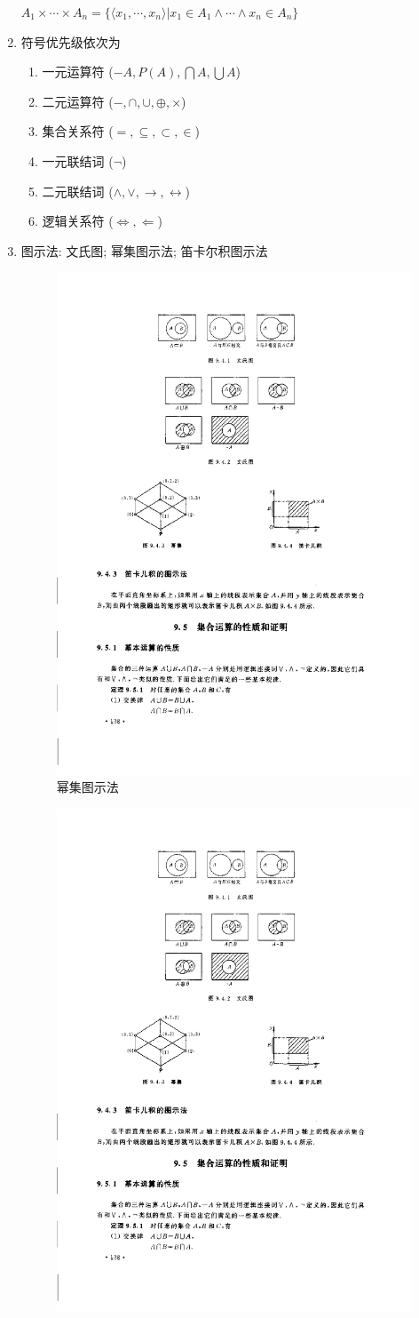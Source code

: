 \documentclass[11pt,a4paper,twocolumn,fleqn]{article} %
\begin{document}
\begin{enumerate}
	$A_1\times\cdots\times A_n = \{\langle x_1, \cdots, x_n \rangle|
	x_1\in A_1\land\cdots\land x_n\in A_n\}$
	\item 符号优先级依次为
	\begin{enumerate}
		\item 一元运算符 ($-A, P(A), \bigcap A, \bigcup A$)
		\item 二元运算符 ($-, \cap, \cup, \oplus, \times$)
		\item 集合关系符 ($=, \subseteq, \subset, \in$)
		\item 一元联结词 ($\lnot$)
		\item 二元联结词 ($\land, \lor, \to, \leftrightarrow$)
		\item 逻辑关系符 ($\Leftrightarrow, \Leftarrow$)
	\end{enumerate}
	\item 图示法: 文氏图; 幂集图示法; 笛卡尔积图示法
	\begin{figure}[!htp]
	 \centering
	 \includegraphics[width=0.6\linewidth]{graph-miji.pdf}
	 \caption{幂集图示法}
	\end{figure}
	\begin{figure}[!htp]
	 \centering
	 \includegraphics[width=0.6\linewidth]{graph-dikaer.pdf}

\end{figure}
\end{enumerate}
\end{document}
